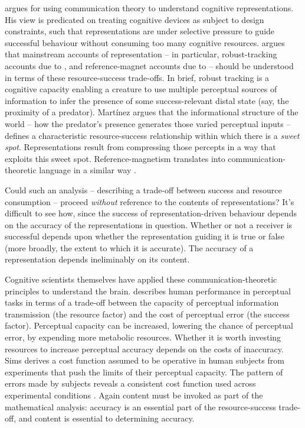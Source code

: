 \documentclass[12pt]{article}
\begin{document}
\citet{martinez2019deception,martinez2019representations} argues for using communication theory to understand cognitive representations.
His view is predicated on treating cognitive devices as subject to design constraints, such that representations are under selective pressure to guide successful behaviour without consuming too many cognitive resources.
\citet{martinez2019representations} argues that mainstream accounts of representation -- in particular, robust-tracking accounts due to \citet{sterelny2003thought,burge2010origins}, and reference-magnet accounts due to \citet{ryder2004sinbad,lewis1984putnam} -- should be understood in terms of these resource-success trade-offs.
In brief, robust tracking is a cognitive capacity enabling a creature to use multiple perceptual sources of information to infer the presence of some success-relevant distal state (say, the proximity of a predator).
Mart\'{i}nez argues that the informational structure of the world -- how the predator's presence generates those varied perceptual inputs -- defines a characteristic resource-success relationship within which there is a \textit{sweet spot}.
Representations result from compressing those percepts in a way that exploits this sweet spot.
Reference-magnetism translates into communication-theoretic language in a similar way \citep[1223]{martinez2019representations}.

Could such an analysis -- describing a trade-off between success and resource consumption -- proceed \textit{without} reference to the contents of representations?
It's difficult to see how, since the success of representation-driven behaviour depends on the accuracy of the representations in question.
Whether or not a receiver is successful depends upon whether the representation guiding it is true or false (more broadly, the extent to which it is accurate).
The accuracy of a representation depends ineliminably on its content.

Cognitive scientists themselves have applied these communication-theoretic principles to understand the brain.
\citet{sims2016ratedistortion} describes human performance in perceptual tasks in terms of a trade-off between the capacity of perceptual information transmission (the resource factor) and the cost of perceptual error (the success factor).
Perceptual capacity can be increased, lowering the chance of perceptual error, by expending more metabolic resources.
Whether it is worth investing resources to increase perceptual accuracy depends on the costs of inaccuracy.
Sims derives a cost function assumed to be operative in human subjects from experiments that push the limits of their perceptual capacity.
The pattern of errors made by subjects reveals a consistent cost function used across experimental conditions \citep[188]{sims2016ratedistortion}.
Again content must be invoked as part of the mathematical analysis: accuracy is an essential part of the resource-success trade-off, and content is essential to determining accuracy.
\end{document}
